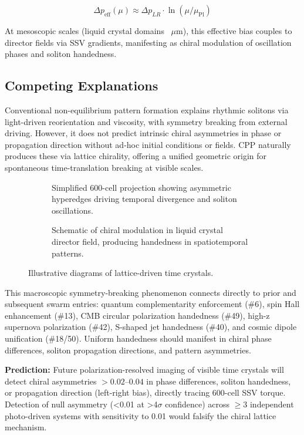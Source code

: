 \documentclass[11pt]{article}
\begin{document}
\[
\Delta p_{\text{eff}}(\mu) \approx \Delta p_{LR} \cdot \ln(\mu / \mu_{\text{Pl}})
\]

At mesoscopic scales (liquid crystal domains ~$\mu$m), this effective bias couples to director fields via SSV gradients, manifesting as chiral modulation of oscillation phases and soliton handedness.

\subsection{Competing Explanations}
Conventional non-equilibrium pattern formation explains rhythmic solitons via light-driven reorientation and viscosity, with symmetry breaking from external driving. However, it does not predict intrinsic chiral asymmetries in phase or propagation direction without ad-hoc initial conditions or fields. CPP naturally produces these via lattice chirality, offering a unified geometric origin for spontaneous time-translation breaking at visible scales.

\begin{figure}[htbp]
\centering
\begin{subfigure}{0.45\textwidth}
\centering
\caption{Simplified 600-cell projection showing asymmetric hyperedges driving temporal divergence and soliton oscillations.}
\label{fig:600cell-soliton}
\end{subfigure}
\hfill
\begin{subfigure}{0.45\textwidth}
\centering
\caption{Schematic of chiral modulation in liquid crystal director field, producing handedness in spatiotemporal patterns.}
\label{fig:director-chiral}
\end{subfigure}
\caption{Illustrative diagrams of lattice-driven time crystals.}
\end{figure}

This macroscopic symmetry-breaking phenomenon connects directly to prior and subsequent swarm entries: quantum complementarity enforcement (\#6), spin Hall enhancement (\#13), CMB circular polarization handedness (\#49), high-z supernova polarization (\#42), S-shaped jet handedness (\#40), and cosmic dipole unification (\#18/50). Uniform handedness should manifest in chiral phase differences, soliton propagation directions, and pattern asymmetries.

\textbf{Prediction:} Future polarization-resolved imaging of visible time crystals will detect chiral asymmetries $> 0.02$--$0.04$ in phase differences, soliton handedness, or propagation direction (left-right bias), directly tracing 600-cell SSV torque. Detection of null asymmetry (<0.01 at >4$\sigma$ confidence) across $\geq 3$ independent photo-driven systems with sensitivity to 0.01 would falsify the chiral lattice mechanism.
\end{document}
